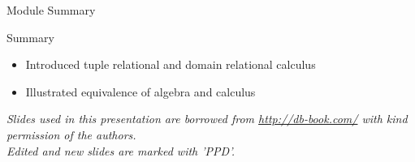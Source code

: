 \documentclass[aspectratio=169, xcolor=dvipsnames]{beamer}
\begin{document}
\begin{frame}{Module Summary}
    \begin{block}{Summary}
        \begin{itemize}[<+->]
            \item Introduced tuple relational and domain relational calculus
            \item Illustrated equivalence of algebra and calculus
        \end{itemize}
    \end{block}
    \vspace{2em}
    \begin{center}
    \small \textit{Slides used in this presentation are borrowed from \url{http://db-book.com/} with kind permission of the authors.} \\
    \small \textit{Edited and new slides are marked with 'PPD'.}
    \end{center}
\end{frame}
\end{document}
